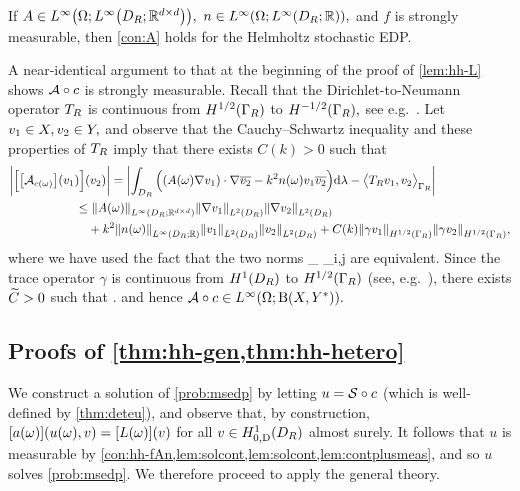 \label{lem:hh-A}

\noindent If $A \in \LiOLiDRRRdtd,$ $n \in \LiOLiDRRR,$ and $f$ is strongly measurable, then \cref{con:A} holds for the Helmholtz stochastic EDP.
\ele

A near-identical argument to that at the beginning of the proof of \cref{lem:hh-L} shows $\mathcal A\circ c$ is strongly measurable. Recall that the Dirichlet-to-Neumann operator $T_{R}$ is continuous from $\HhGR$ to $\HmhGR,$ see e.g.~\cite[Theorem 2.6.4]{Ne:01}. Let $v_{1} \in X, v_{2} \in Y,$ and observe that the Cauchy--Schwartz inequality and these properties of $T_{R}$
imply that there exists $C(k) > 0$ such that 
\begin{align*}
\bigg|\Big[\mleft[\Acomega\mright](\vo)\Big](\vt)\bigg| &= \abs{\int_{\DR} \Big(\mleft(A(\omega) \grad \vo\mright)\cdot\grad \vtb - k^2n(\omega) \vo\vtb \Big)\dd\Leb- \IPGRbig{\DtN \vo}{\vt}}\\
&\hspace{-1cm}\leq \NLiDRRRdtd{A(\omega)}  \NLtDR{\grad \vo}\NLtDR{\grad \vt}\\
&\hspace{-1cm}\quad+ k^2 \NLiDRRR{n(\omega)}\NLtDR{\vo}\NLtDR{\vt}+ C(k) \NHhGR{\gamma\vo}\NHhGR{\gamma\vt},
\end{align*}
where we have used the fact that the two norms
\beq\label{eq:normsdef}
 \esssup_{\bx \in \DR}  \quad\tand\quad{} \de \max_{i,j \in {}} 
\eeq
are equivalent.
Since the trace operator $\gamma$ is continuous from $\HoDR$ to $\HhGR$ (see, e.g.~\cite[Theorem 3.38]{Mc:00}), there exists $\widetilde{C} > 0$ such that
\beqs
\Nhomspace{\mleft(\toform\circ\coeff\mright)(\omega)}\leq\Ctilde\max{}\Nw{\vo}\Nw{\vt}.
\eeqs
and hence $\toform\circ\coeff \in \LiOhomspace.$
\epf

\subsection{Proofs of \cref{thm:hh-gen,thm:hh-hetero}}\label{sec:applying}

We construct a solution of \cref{prob:msedp} by letting $u = \mathcal S\circ c$ (which is well-defined by \cref{thm:deteu}), and observe that, by construction, $\mleft[a(\omega)\mright]\mleft(u(\omega),v\mright) = \mleft[L(\omega)\mright](v)$ for all $v \in \HozDDR$ almost surely. It follows that $u$ is measurable by \cref{con:hh-fAn,lem:solcont,lem:solcont,lem:contplusmeas}, and so $u$ solves \cref{prob:msedp}. We therefore proceed to apply the general theory.

